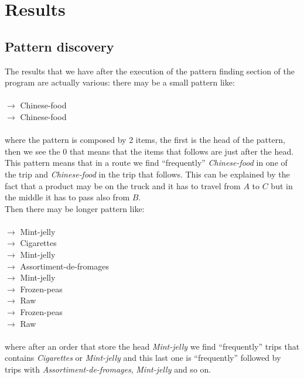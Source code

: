 \documentclass{acm_proc_article-sp-sigmod09}
\begin{document}
	\section{Results}
	\subsection{Pattern discovery}
	The results that we have after the execution of the pattern finding section of the program are actually various: there may be a small pattern like:\\ \\
	\null \qquad \qquad $\rightarrow$ Chinese-food \\ \null \qquad \qquad \qquad {} $\rightarrow$ Chinese-food\\ \\
	where the pattern is composed by 2 items, the first is the head of the pattern, then we see the $0$ that means that the items that follows are just after the head. This pattern means that in a route we find ``frequently'' \textit{Chinese-food} in one of the trip and \textit{Chinese-food} in the trip that follows. This can be explained by the fact that a product may be on the truck and it has to travel from $A$ to $C$ but in the middle it has to pass also from $B$.\\
	Then there may be longer pattern like:\\ \\
		\null \qquad \qquad $\rightarrow$ Mint-jelly \\ 
		\null \qquad \qquad {} $\rightarrow$ Cigarettes\\
		\null \qquad \qquad {} $\rightarrow$ Mint-jelly\\
		\null \qquad \qquad \qquad {} $\rightarrow$ Assortiment-de-fromages\\
		\null \qquad \qquad \qquad {} $\rightarrow$ Mint-jelly\\
		\null \qquad \qquad \qquad \qquad {} $\rightarrow$ Frozen-peas\\
		\null \qquad \qquad \qquad \qquad \qquad {} $\rightarrow$ Raw\\
		\null \qquad \qquad \qquad {} $\rightarrow$ Frozen-peas\\
		\null \qquad \qquad \qquad \qquad {} $\rightarrow$ Raw\\ \\
	where after an order that store the head \textit{Mint-jelly} we find ``frequently'' trips that contains \textit{Cigarettes} or \textit{Mint-jelly} and this last one is ``frequently'' followed by trips with \textit{Assortiment-de-fromages}, \textit{Mint-jelly} and so on.\\ \\ \\ \\ \\
\end{document}
